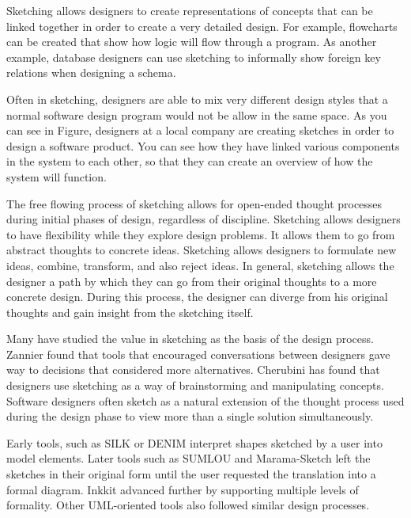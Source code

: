 Sketching allows designers to create representations of concepts that can be linked together in order to create a very detailed design. For example, flowcharts can be created that show how logic will flow through a program. As another example, database designers can use sketching to informally show foreign key relations when designing a schema. 

Often in sketching, designers are able to mix very different design styles that a normal software design program would not be allow in the same space. As you can see in Figure, designers at a local company are creating sketches in order to design a software product. You can see how they have linked various components in the system to each other, so that they can create an overview of how the system will function.

The free flowing process of sketching allows for open-ended thought processes during initial phases of design, regardless of discipline. Sketching allows designers to have flexibility while they explore design problems. It allows them to go from abstract thoughts to concrete ideas\cite{todo}. Sketching allows designers to formulate new ideas, combine, transform, and also reject ideas\cite{todo}. In general, sketching allows the designer a path by which they can go from their original thoughts to a more concrete design. During this process, the designer can diverge from his original thoughts and gain insight from the sketching itself\cite{todo}.

Many have studied the value in sketching as the basis of the design process. Zannier found that tools that encouraged conversations between designers gave way to decisions that considered more alternatives\cite{todo}. Cherubini has found that designers use sketching as a way of brainstorming and manipulating concepts\cite{todo}. Software designers often sketch as a natural extension of the thought process used during the design phase to view more than a single solution simultaneously\cite{todo}.

Early tools, such as SILK\cite{todo} or DENIM\cite{todo} interpret shapes sketched by a user into model elements. Later tools such as SUMLOU\cite{todo} and Marama-Sketch\cite{todo} left the sketches in their original form until the user requested the translation into a formal diagram. Inkkit\cite{todo} advanced further by supporting multiple levels of formality. Other UML-oriented tools also followed similar design processes\cite{todo}.

